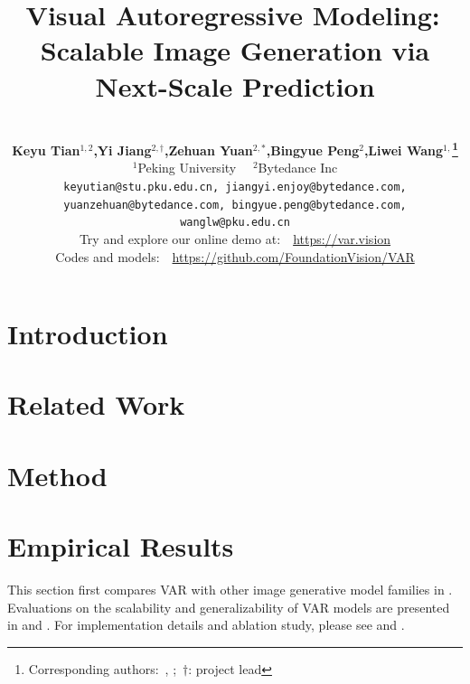 \documentclass{article}
\title{Visual Autoregressive Modeling:\, Scalable Image Generation via Next-Scale Prediction}
\author{
  \vspace{-25pt}\\
  \textbf{Keyu Tian$^{1,2}$,\quad Yi Jiang$^{2,\dag}$,\quad Zehuan Yuan$^{2,*}$,\quad Bingyue Peng$^2$,\quad Liwei Wang$^{1,}$\thanks{Corresponding authors: \,\href{mailto:wanglw@pku.edu.cn}{\color{black}{wanglw@pku.edu.cn}}, \href{mailto:yuanzehuan@bytedance.com}{\color{black}{yuanzehuan@bytedance.com}};\, $\dag$: project lead }}\vspace{3pt} \\
  $^1$Peking University ~~\quad\quad $^2$Bytedance Inc\vspace{3pt} \\
  \texttt{\small keyutian@stu.pku.edu.cn, jiangyi.enjoy@bytedance.com,} \\ 
  \texttt{\small yuanzehuan@bytedance.com, bingyue.peng@bytedance.com, wanglw@pku.edu.cn}\vspace{8pt}  \\
  Try and explore our online demo at:~\, \url{https://var.vision}\vspace{5pt} \\
  Codes and models:~\, \url{https://github.com/FoundationVision/VAR}
  \vspace{-4pt} \\
}
\begin{document}
\maketitle







\vspace{-2pt}
\section{Introduction} \label{sec:intro}
\vspace{-4pt}



\vspace{-2pt}
\section{Related Work} \label{sec:related}
\vspace{-2pt}



\section{Method} \label{sec:method}



\section{Empirical Results} \label{sec:exp}
\vspace{-2pt}

This section first compares VAR with other image generative model families in .
Evaluations on the scalability and generalizability of VAR models are presented in  and .
For implementation details and ablation study, please see  and .













\appendix



\clearpage
\newpage


\clearpage
{
\small


}
\end{document}
